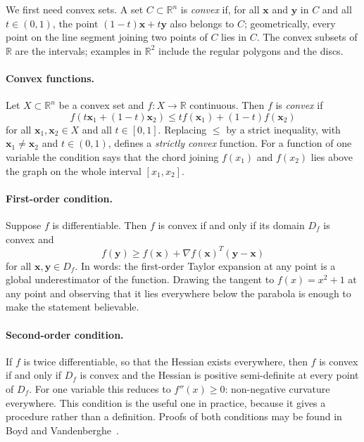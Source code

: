 We first need convex sets.  A set $C\subset\mathbb{R}^{n}$ is \emph{convex} if,
for all $\bm{x}$ and $\bm{y}$ in $C$ and all $t\in(0,1)$, the point
$(1-t)\bm{x}+t\bm{y}$ also belongs to $C$; geometrically, every point on the
line segment joining two points of $C$ lies in $C$.  The convex subsets of
$\mathbb{R}$ are the intervals; examples in $\mathbb{R}^{2}$ include the
regular polygons and the discs.

\paragraph{Convex functions.}
Let $X\subset\mathbb{R}^{n}$ be a convex set and $f:X\rightarrow\mathbb{R}$
continuous.  Then $f$ is \emph{convex} if
\begin{equation}
  f\left(t\bm{x}_1+(1-t)\bm{x}_2\right)
   \le t f(\bm{x}_1) + (1-t) f(\bm{x}_2)
  \label{eq:4-convexdef}
\end{equation}
for all $\bm{x}_1,\bm{x}_2\in X$ and all $t\in[0,1]$.  Replacing $\le$ by a
strict inequality, with $\bm{x}_1\neq\bm{x}_2$ and $t\in(0,1)$, defines a
\emph{strictly convex} function.  For a function of one variable the condition
says that the chord joining $f(x_1)$ and $f(x_2)$ lies above the graph on the
whole interval $[x_1,x_2]$.

\paragraph{First-order condition.}
Suppose $f$ is differentiable.  Then $f$ is convex if and only if its domain
$D_f$ is convex and
\begin{equation}
  f(\bm{y}) \ge f(\bm{x}) + \nabla f(\bm{x})^{T}(\bm{y}-\bm{x})
  \label{eq:4-firstorder}
\end{equation}
for all $\bm{x},\bm{y}\in D_f$.  In words: the first-order Taylor expansion at
any point is a global underestimator of the function.  Drawing the tangent to
$f(x)=x^{2}+1$ at any point and observing that it lies everywhere below the
parabola is enough to make the statement believable.

\paragraph{Second-order condition.}
If $f$ is twice differentiable, so that the Hessian exists everywhere, then
$f$ is convex if and only if $D_f$ is convex and the Hessian is positive
semi-definite at every point of $D_f$.  For one variable this reduces to
$f''(x)\ge0$: non-negative curvature everywhere.  This condition is the useful
one in practice, because it gives a procedure rather than a definition.  Proofs
of both conditions may be found in Boyd and Vandenberghe~\cite{boyd2004}.

